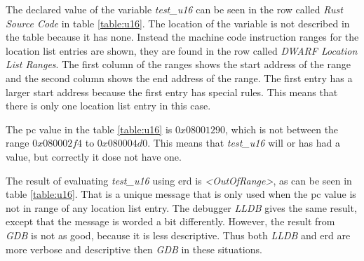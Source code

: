The declared value of the variable \emph{test\_u16} can be seen in the row called \emph{Rust Source Code} in table \ref{table:u16}.
The location of the variable is not described in the table because it has none.
Instead the machine code instruction ranges for the location list entries are shown, they are found in the row called \emph{DWARF Location List Ranges}.
The first column of the ranges shows the start address of the range and the second column shows the end address of the range.
The first  entry has a larger start address because the first entry has special rules.
This means that there is only one location list entry in this case.


The \gls{pc} value in the table \ref{table:u16} is $0x08001290$, which is not between the range $0x080002f4$ to $0x080004d0$.
This means that \emph{test\_u16} will or has had a value, but correctly it dose not have one.


The result of evaluating \emph{test\_u16} using \gls{erd} is \emph{\textless OutOfRange\textgreater}, as can be seen in table \ref{table:u16}.
That is a unique message that is only used when the \gls{pc} value is not in range of any location list entry.
The debugger \emph{LLDB} gives the same result, except that the message is worded a bit differently.
However, the result from \emph{GDB} is not as good, because it is less descriptive.
Thus both \emph{LLDB} and \gls{erd} are more verbose and descriptive then \emph{GDB} in these situations.

